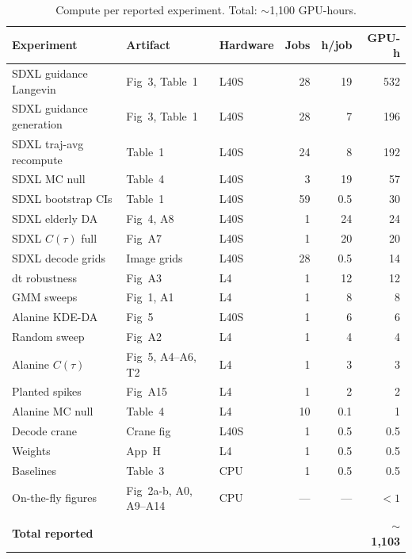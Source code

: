 \documentclass{article}
\begin{document}
\begin{table}[h]
\centering
\small
\caption{Compute per reported experiment. Total: $\sim$1{,}100 GPU-hours.}
\label{tab:compute_breakdown}
\begin{tabular}{lllrrr}
\toprule
Experiment & Artifact & Hardware & Jobs & h/job & GPU-h \\
\midrule
SDXL guidance Langevin     & Fig~3, Table~1     & L40S & 28 & 19  & 532 \\
SDXL guidance generation   & Fig~3, Table~1     & L40S & 28 & 7   & 196 \\
SDXL traj-avg recompute    & Table~1            & L40S & 24 & 8   & 192 \\
SDXL MC null               & Table~4            & L40S & 3  & 19  & 57  \\
SDXL bootstrap CIs         & Table~1            & L40S & 59 & 0.5 & 30  \\
SDXL elderly DA            & Fig~4, A8          & L40S & 1  & 24  & 24  \\
SDXL $C(\tau)$ full        & Fig~A7             & L40S & 1  & 20  & 20  \\
SDXL decode grids          & Image grids        & L40S & 28 & 0.5 & 14  \\
dt robustness              & Fig~A3             & L4   & 1  & 12  & 12  \\
GMM sweeps                 & Fig~1, A1          & L4   & 1  & 8   & 8   \\
Alanine KDE-DA             & Fig~5              & L40S & 1  & 6   & 6   \\
Random sweep               & Fig~A2             & L4   & 1  & 4   & 4   \\
Alanine $C(\tau)$          & Fig~5, A4--A6, T2  & L4   & 1  & 3   & 3   \\
Planted spikes             & Fig~A15            & L4   & 1  & 2   & 2   \\
Alanine MC null            & Table~4            & L4   & 10 & 0.1 & 1   \\
Decode crane               & Crane fig          & L40S & 1  & 0.5 & 0.5 \\
Weights                    & App~H              & L4   & 1  & 0.5 & 0.5 \\
Baselines                  & Table~3            & CPU  & 1  & 0.5 & 0.5 \\
On-the-fly figures         & Fig~2a-b, A0, A9--A14 & CPU & --- & --- & $<1$ \\
\midrule
\textbf{Total reported} & & & & & \textbf{$\sim$1{,}103} \\
\bottomrule
\end{tabular}
\end{table}
\end{document}
